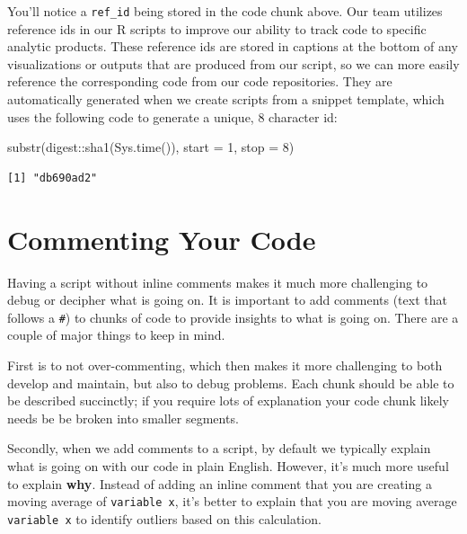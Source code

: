 \documentclass[
  letterpaper,
  DIV=11,
  numbers=noendperiod]{scrreprt}
\newenvironment{Shaded}{\begin{snugshade}}{\end{snugshade}}
\newcommand{\AttributeTok}[1]{\textcolor[rgb]{0.40,0.45,0.13}{#1}}
\newcommand{\DecValTok}[1]{\textcolor[rgb]{0.68,0.00,0.00}{#1}}
\newcommand{\FunctionTok}[1]{\textcolor[rgb]{0.28,0.35,0.67}{#1}}
\newcommand{\NormalTok}[1]{\textcolor[rgb]{0.00,0.23,0.31}{#1}}
\newcommand{\SpecialCharTok}[1]{\textcolor[rgb]{0.37,0.37,0.37}{#1}}
\begin{document}
You'll notice a \texttt{ref\_id} being stored in the code chunk above.
Our team utilizes reference ids in our R scripts to improve our ability
to track code to specific analytic products. These reference ids are
stored in captions at the bottom of any visualizations or outputs that
are produced from our script, so we can more easily reference the
corresponding code from our code repositories. They are automatically
generated when we create scripts from a snippet template, which uses the
following code to generate a unique, 8 character id:

\begin{Shaded}
\begin{Highlighting}[]
\FunctionTok{substr}\NormalTok{(digest}\SpecialCharTok{::}\FunctionTok{sha1}\NormalTok{(}\FunctionTok{Sys.time}\NormalTok{()), }\AttributeTok{start =} \DecValTok{1}\NormalTok{, }\AttributeTok{stop =} \DecValTok{8}\NormalTok{)}
\end{Highlighting}
\end{Shaded}

\begin{verbatim}
[1] "db690ad2"
\end{verbatim}

\hypertarget{commenting-your-code}{%
\section{Commenting Your Code}\label{commenting-your-code}}

Having a script without inline comments makes it much more challenging
to debug or decipher what is going on. It is important to add comments
(text that follows a \texttt{\#}) to chunks of code to provide insights
to what is going on. There are a couple of major things to keep in mind.

First is to not over-commenting, which then makes it more challenging to
both develop and maintain, but also to debug problems. Each chunk should
be able to be described succinctly; if you require lots of explanation
your code chunk likely needs be be broken into smaller segments.

Secondly, when we add comments to a script, by default we typically
explain what is going on with our code in plain English. However, it's
much more useful to explain \textbf{why}. Instead of adding an inline
comment that you are creating a moving average of \texttt{variable\ x},
it's better to explain that you are moving average \texttt{variable\ x}
to identify outliers based on this calculation.
\end{document}
